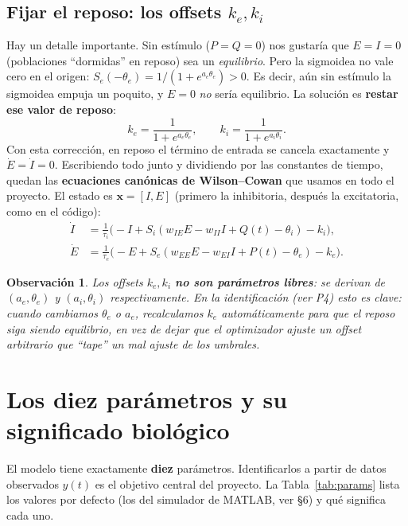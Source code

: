 \documentclass[11pt,a4paper]{article}
\newtheorem{remark}{Observación}
\begin{document}
\subsection{Fijar el reposo: los offsets $k_e,k_i$}
Hay un detalle importante. Sin estímulo ($P=Q=0$) nos gustaría que $E=I=0$ (poblaciones ``dormidas'' en reposo) sea un \emph{equilibrio}. Pero la sigmoidea no vale cero en el origen: $S_e(-\theta_e)=1/(1+e^{a_e\theta_e})>0$. Es decir, aún sin estímulo la sigmoidea empuja un poquito, y $E=0$ \emph{no} sería equilibrio. La solución es \textbf{restar ese valor de reposo}:
\[
k_e = \frac{1}{1+e^{a_e\theta_e}}, \qquad k_i = \frac{1}{1+e^{a_i\theta_i}}.
\]
Con esta corrección, en reposo el término de entrada se cancela exactamente y $\dot E=\dot I=0$. Escribiendo todo junto y dividiendo por las constantes de tiempo, quedan las \textbf{ecuaciones canónicas de Wilson--Cowan} que usamos en todo el proyecto. El estado es $\mathbf{x}=[I,E]$ (primero la inhibitoria, después la excitatoria, como en el código):
\begin{equation}
\boxed{\;
\begin{aligned}
\dot I &= \tfrac{1}{\tau_i}\big(-I + S_i(w_{IE}E - w_{II}I + Q(t) - \theta_i) - k_i\big),\\[4pt]
\dot E &= \tfrac{1}{\tau_e}\big(-E + S_e(w_{EE}E - w_{EI}I + P(t) - \theta_e) - k_e\big).
\end{aligned}
\;}
\end{equation}

\begin{remark}
Los offsets $k_e,k_i$ \textbf{no son parámetros libres}: se derivan de $(a_e,\theta_e)$ y $(a_i,\theta_i)$ respectivamente. En la identificación (ver P4) esto es clave: cuando cambiamos $\theta_e$ o $a_e$, recalculamos $k_e$ automáticamente para que el reposo siga siendo equilibrio, en vez de dejar que el optimizador ajuste un offset arbitrario que ``tape'' un mal ajuste de los umbrales.
\end{remark}

\section{Los diez parámetros y su significado biológico}

El modelo tiene exactamente \textbf{diez} parámetros. Identificarlos a partir de datos observados $y(t)$ es el objetivo central del proyecto. La Tabla~\ref{tab:params} lista los valores por defecto (los del simulador de MATLAB, ver §6) y qué significa cada uno.
\end{document}
